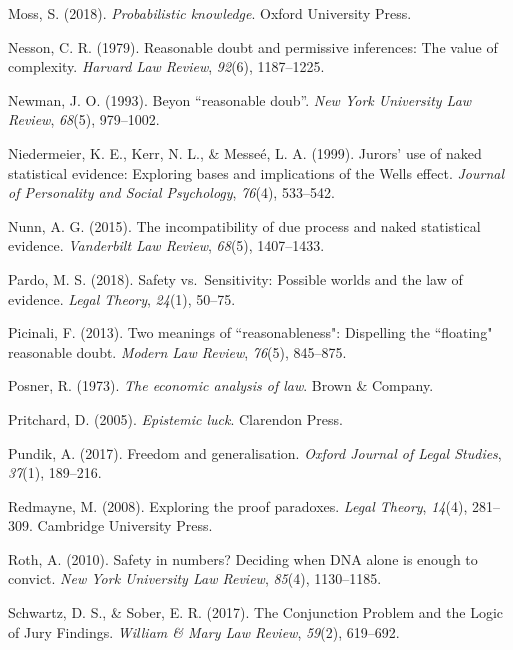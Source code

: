 \documentclass[10pt,dvipsnames,enabledeprecatedfontcommands]{scrartcl}
\begin{document}
\leavevmode\hypertarget{ref-moss2018}{}%
Moss, S. (2018). \emph{Probabilistic knowledge}. Oxford University
Press.

\leavevmode\hypertarget{ref-Nesson1979Reasonable-doub}{}%
Nesson, C. R. (1979). Reasonable doubt and permissive inferences: The
value of complexity. \emph{Harvard Law Review}, \emph{92}(6),
1187--1225.

\leavevmode\hypertarget{ref-newman1993}{}%
Newman, J. O. (1993). Beyon ``reasonable doub''. \emph{New York
University Law Review}, \emph{68}(5), 979--1002.

\leavevmode\hypertarget{ref-niedermeierEtAl1999}{}%
Niedermeier, K. E., Kerr, N. L., \& Messeé, L. A. (1999). Jurors' use of
naked statistical evidence: Exploring bases and implications of the
Wells effect. \emph{Journal of Personality and Social Psychology},
\emph{76}(4), 533--542.

\leavevmode\hypertarget{ref-nunn2015}{}%
Nunn, A. G. (2015). The incompatibility of due process and naked
statistical evidence. \emph{Vanderbilt Law Review}, \emph{68}(5),
1407--1433.

\leavevmode\hypertarget{ref-pardo2018}{}%
Pardo, M. S. (2018). Safety vs.~Sensitivity: Possible worlds and the law
of evidence. \emph{Legal Theory}, \emph{24}(1), 50--75.

\leavevmode\hypertarget{ref-picinali2013}{}%
Picinali, F. (2013). Two meanings of ``reasonableness": Dispelling the
``floating" reasonable doubt. \emph{Modern Law Review}, \emph{76}(5),
845--875.

\leavevmode\hypertarget{ref-Posner1973}{}%
Posner, R. (1973). \emph{The economic analysis of law}. Brown \&
Company.

\leavevmode\hypertarget{ref-pritchard2005epistemic}{}%
Pritchard, D. (2005). \emph{Epistemic luck}. Clarendon Press.

\leavevmode\hypertarget{ref-pundik2017}{}%
Pundik, A. (2017). Freedom and generalisation. \emph{Oxford Journal of
Legal Studies}, \emph{37}(1), 189--216.

\leavevmode\hypertarget{ref-redmayne2008exploring}{}%
Redmayne, M. (2008). Exploring the proof paradoxes. \emph{Legal Theory},
\emph{14}(4), 281--309. Cambridge University Press.

\leavevmode\hypertarget{ref-Roth2010}{}%
Roth, A. (2010). Safety in numbers? Deciding when DNA alone is enough to
convict. \emph{New York University Law Review}, \emph{85}(4),
1130--1185.

\leavevmode\hypertarget{ref-schwartz2017ConjunctionProblemLogic}{}%
Schwartz, D. S., \& Sober, E. R. (2017). The Conjunction Problem and the
Logic of Jury Findings. \emph{William \& Mary Law Review}, \emph{59}(2),
619--692.
\end{document}
